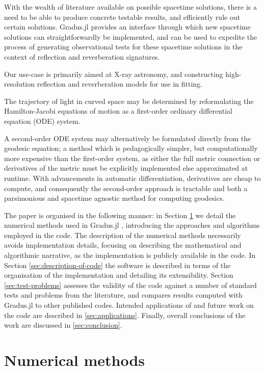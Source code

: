 \documentclass[fleqn,usenatbib]{mnras}
\newcommand{\Gradus}{Gradus.jl }
\begin{document}
With the wealth of literature available on possible spacetime solutions, there
is a need to be able to produce concrete testable results, and efficiently rule
out certain solutions. \Gradus provides an interface through which new spacetime
solutions can straightforwardly be implemented, and can be used to expedite the
process of generating observational tests for these spacetime solutions in the
context of reflection and reverberation signatures.

Our use-case is primarily aimed at X-ray astronomy, and constructing
high-resolution reflection and reverberation models for use in fitting.

The trajectory of light in curved space may be determined by reformulating the
Hamilton-Jacobi equations of motion as a first-order ordinary differential
equation (ODE) system.

A second-order ODE system may alternatively be formulated directly from the
geodesic equation; a method which is pedagogically simpler, but computationally
more expensive than the first-order system, as either the full metric connection
or derivatives of the metric must be explicitly implemented else approximated at
runtime. With advancements in automatic differentiation, derivatives are cheap
to compute, and consequently the second-order approach is tractable and both a
parsimonious and spacetime agnostic method for computing geodesics.

The paper is organised in the following manner: in Section
\ref{sec:numerical-methods} we detail the numerical methods used in \Gradus,
introducing the approaches and algorithms employed in the code. The description
of the numerical methods necessarily avoids implementation details, focusing on
describing the mathematical and algorithmic narrative, as the implementation is
publicly available in the code. In Section \ref{sec:description-of-code} the
software is described in terms of the organisation of the implementation and
detailing its extensibility. Section \ref{sec:test-problems} assesses the
validity of the code against a number of standard tests and problems from the
literature, and compares results computed with \Gradus to other published codes.
Intended applications of and future work on the code are described in
\ref{sec:applications}. Finally, overall conclusions of the work are discussed
in \ref{sec:conclusion}.

\section{Numerical methods}
\label{sec:numerical-methods}
\end{document}
